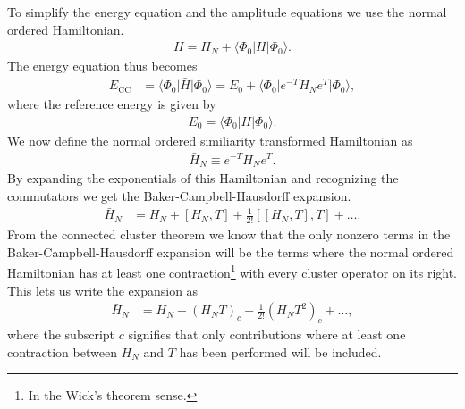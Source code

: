 \documentclass[
    a4paper, aps, twocolumn, floatfix, superscriptaddress,
    nofootinbib]{revtex4-1}
\newcommand{\1}{\mathds{1}}
\newcommand{\com}[2]{\left[#1, #2\right]}
\newcommand{\para}[1]{\left(#1\right)}
\newcommand{\bra}[1]{\langle #1\lvert}
\newcommand{\ket}[1]{\rvert #1\rangle}
\newcommand{\kslat}{\ket{\Phi_0}}
\newcommand{\bslat}{\bra{\Phi_0}}
\newcommand{\ecc}{E_{\text{CC}}}
\begin{document}
        To simplify the energy equation and the amplitude equations we use the
        normal ordered Hamiltonian.
        \begin{align}
            H = H_N + \bslat H\kslat.
        \end{align}
        The energy equation thus becomes
        \begin{align}
            \ecc &= \bslat\bar{H}\kslat
            = E_0 + \bslat e^{-T}H_N e^T\kslat,
        \end{align}
        where the reference energy is given by
        \begin{align}
            E_0 = \bslat H\kslat.
        \end{align}
        We now define the normal ordered similiarity transformed Hamiltonian as
        \begin{align}
            \bar{H}_N \equiv e^{-T}H_N e^T.
        \end{align}
        By expanding the exponentials of this Hamiltonian and recognizing the
        commutators we get the Baker-Campbell-Hausdorff expansion.
        \begin{align}
            \bar{H}_N
            &=
            H_N + \com{H_N}{T} + \frac{1}{2!}\com{\com{H_N}{T}}{T} + \dots.
        \end{align}
        From the connected cluster theorem we know that the only nonzero terms
        in the Baker-Campbell-Hausdorff expansion will be the terms where the
        normal ordered Hamiltonian has at least one contraction\footnote{In the
        Wick's theorem sense.} with every cluster operator on its right. This
        lets us write the expansion as
        \begin{align}
            \bar{H}_N
            &=
            H_N + \para{H_N T}_c + \frac{1}{2!}\para{H_N T^2}_c + \dots,
            \label{eq:sim_norm_hamiltionian_expansion}
        \end{align}
        where the subscript $c$ signifies that only contributions where at least
        one contraction between $H_N$ and $T$ has been performed will be
        included.
\end{document}
